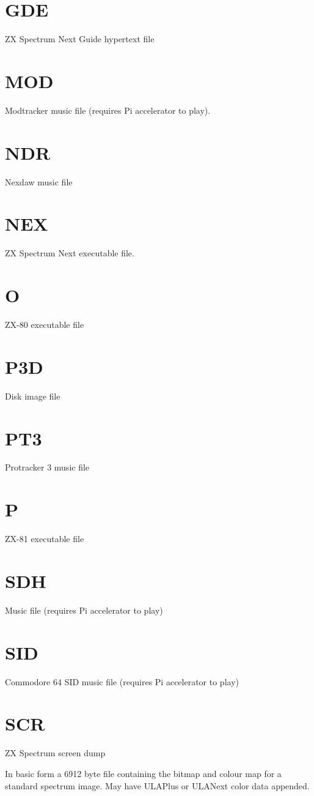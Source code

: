 \section{GDE}
ZX Spectrum Next Guide hypertext file
\section{MOD}
Modtracker music file (requires Pi accelerator to play).
\section{NDR}
Nexdaw music file
\section{NEX}
ZX Spectrum Next executable file.
\section{O}
ZX-80 executable file
\section{P3D}
Disk image file
\section{PT3}
Protracker 3 music file
\section{P}
ZX-81 executable file
\section{SDH}
Music file (requires Pi accelerator to play)
\section{SID}
Commodore 64 SID music file (requires Pi accelerator to play)
\section{SCR}
ZX Spectrum screen dump

In basic form a 6912 byte file containing the bitmap and colour map
for a standard spectrum image. May have ULAPlus or ULANext color data
appended.

